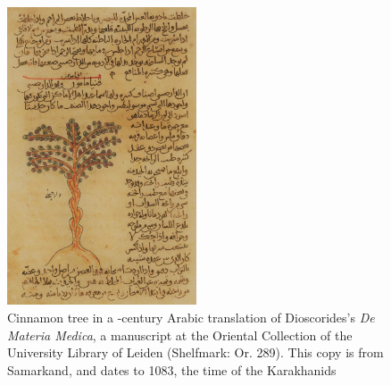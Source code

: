\begin{figure}
    \includegraphics[width=0.5\textwidth]{imgs/figs/cinnamon_manuscipt_cr.jpg}
  \caption{Cinnamon tree in a -century Arabic translation of Dioscorides's \textit{De Materia Medica}, a manuscript at the Oriental Collection of the University Library of Leiden (Shelfmark: Or. 289). This copy is from Samarkand, and dates to 1083, the time of the Karakhanids \parencite[f. 9a]{dioscorides_kitab_1083}}
\label{fig:cinnamon_manuscript}
\end{figure}

